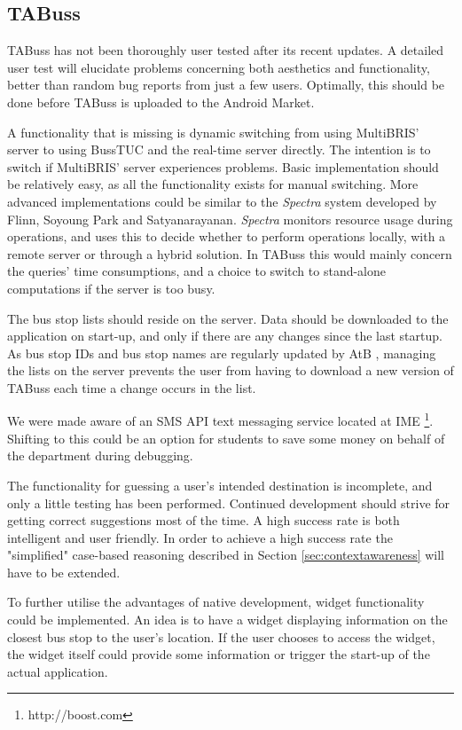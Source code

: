 \subsection{TABuss}
\label{tabuss}
TABuss has not been thoroughly user tested after its recent updates. A detailed user test will elucidate problems concerning both aesthetics and functionality, better than random bug reports from just a few users. Optimally, this should be done before TABuss is uploaded to the Android Market. 

A functionality that is missing is dynamic switching from using MultiBRIS' server to using BussTUC and the real-time server directly. The intention is to switch if MultiBRIS' server experiences problems. Basic implementation should be relatively easy, as all the functionality exists for manual switching. More advanced implementations could be similar to the \emph{Spectra} system developed by Flinn, Soyoung Park and Satyanarayanan\cite{spectra}. \emph{Spectra} monitors resource usage during operations, and uses this to decide whether to perform operations locally, with a remote server or through a hybrid solution. In TABuss this would mainly concern the queries' time consumptions, and a choice to switch to stand-alone computations if the server is too busy. 

The bus stop lists should reside on the server. Data should be downloaded to the application on start-up, and only if there are any changes since the last startup. As bus stop IDs and bus stop names are regularly updated by AtB , managing the lists on the server prevents the user from having to download a new version of TABuss each time a change occurs in the list.

We were made aware of an SMS API text messaging service located at IME \footnote{http://boost.com}. Shifting to this could be an option for students to save some money on behalf of the department during debugging.

The functionality for guessing a user's intended destination is incomplete, and only a little testing has been performed. Continued development should strive for getting correct suggestions most of the time. A high success rate is both intelligent and user friendly. In order to achieve a high success rate the "simplified" case-based reasoning described in Section \ref{sec:contextawareness} will have to be extended.

To further utilise the advantages of native development, widget functionality could be implemented. An idea is to have a widget displaying information on the closest bus stop to the user's location. If the user chooses to access the widget, the widget itself could provide some information or trigger the start-up of the actual application.

